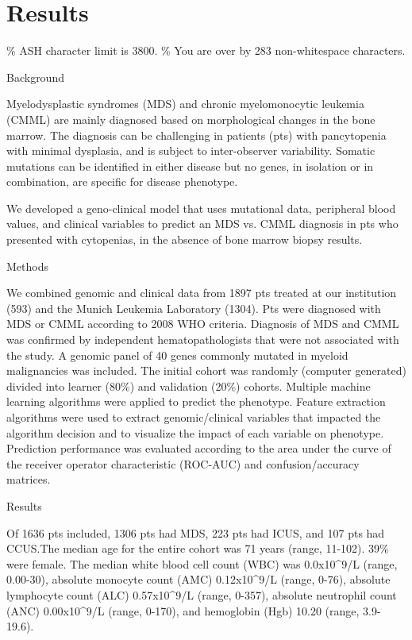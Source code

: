 \section{Results}%
\% ASH character limit is 3800. 
\% You are over by 283 non-whitespace characters.


Background

Myelodysplastic syndromes (MDS) and chronic myelomonocytic leukemia (CMML) are mainly diagnosed based on morphological changes in the bone marrow. The diagnosis can be challenging in patients (pts) with pancytopenia with minimal dysplasia, and is subject to inter-observer variability. Somatic mutations can be identified in either disease but no genes, in isolation or in combination, are specific for disease phenotype.

We developed a geno-clinical model that uses mutational data, peripheral blood values, and clinical variables to predict an MDS vs. CMML diagnosis in pts who presented with cytopenias, in the absence of bone marrow biopsy results.


Methods

We combined genomic and clinical data from 1897 pts treated at our institution (593) and the Munich Leukemia Laboratory (1304). Pts were diagnosed with MDS or CMML according to 2008 WHO criteria. Diagnosis of MDS and CMML was confirmed by independent hematopathologists that were not associated with the study. A genomic panel of 40 genes commonly mutated in myeloid malignancies was included. The initial cohort was randomly (computer generated) divided into learner (80\%) and validation (20\%) cohorts. Multiple machine learning algorithms were applied to predict the phenotype. Feature extraction algorithms were used to extract genomic/clinical variables that impacted the algorithm decision and to visualize the impact of each variable on phenotype. Prediction performance was evaluated according to the area under the curve of the receiver operator characteristic (ROC-AUC) and confusion/accuracy matrices.


Results

Of 1636 pts included, 1306 pts had MDS, 223 pts had ICUS, and 107 pts had CCUS.The median age for the entire cohort was 71 years (range, 11-102). 39\% were female. The median white blood cell count (WBC) was 0.0x10^9/L (range, 0.00-30), absolute monocyte count (AMC) 0.12x10^9/L (range, 0-76), absolute lymphocyte count (ALC) 0.57x10^9/L (range, 0-357), absolute neutrophil count (ANC) 0.00x10^9/L (range, 0-170), and hemoglobin (Hgb)  10.20 (range, 3.9-19.6). 

